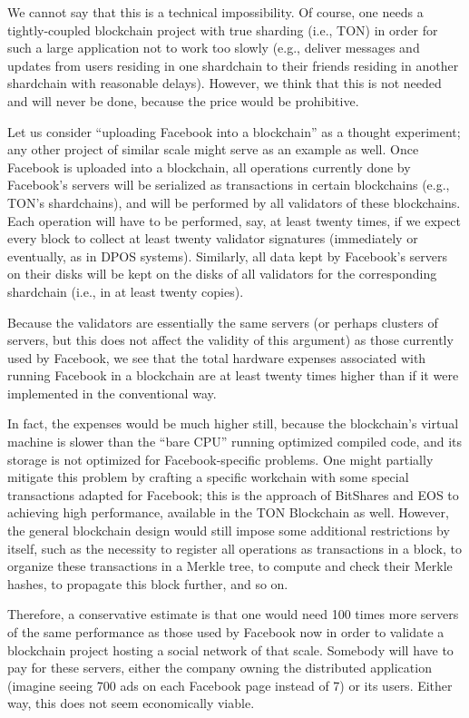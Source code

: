 \documentclass[12pt,oneside]{article}
\begin{document}
We cannot say that this is a technical impossibility. Of course, one
needs a tightly-coupled blockchain project with true sharding (i.e.,
TON) in order for such a large application not to work too slowly
(e.g., deliver messages and updates from users residing in one
shardchain to their friends residing in another shardchain with
reasonable delays). However, we think that this is not needed and will
never be done, because the price would be prohibitive.

Let us consider ``uploading Facebook into a blockchain'' as a thought
experiment; any other project of similar scale might serve as an
example as well. Once Facebook is uploaded into a blockchain, all
operations currently done by Facebook's servers will be serialized as
transactions in certain blockchains (e.g., TON's shardchains), and
will be performed by all validators of these blockchains. Each
operation will have to be performed, say, at least twenty times, if we
expect every block to collect at least twenty validator signatures
(immediately or eventually, as in DPOS systems). Similarly, all data
kept by Facebook's servers on their disks will be kept on the disks of
all validators for the corresponding shardchain (i.e., in at least
twenty copies).

Because the validators are essentially the same servers (or perhaps
clusters of servers, but this does not affect the validity of this
argument) as those currently used by Facebook, we see that the total
hardware expenses associated with running Facebook in a blockchain are
at least twenty times higher than if it were implemented in the
conventional way.

In fact, the expenses would be much higher still, because the
blockchain's virtual machine is slower than the ``bare CPU'' running
optimized compiled code, and its storage is not optimized for
Facebook-specific problems. One might partially mitigate this problem
by crafting a specific workchain with some special transactions
adapted for Facebook; this is the approach of BitShares and EOS to
achieving high performance, available in the TON Blockchain as
well. However, the general blockchain design would still impose some
additional restrictions by itself, such as the necessity to register
all operations as transactions in a block, to organize these
transactions in a Merkle tree, to compute and check their Merkle
hashes, to propagate this block further, and so on.

Therefore, a conservative estimate is that one would need 100 times
more servers of the same performance as those used by Facebook now in
order to validate a blockchain project hosting a social network of
that scale. Somebody will have to pay for these servers, either the
company owning the distributed application (imagine seeing 700 ads on
each Facebook page instead of 7) or its users. Either way, this does
not seem economically viable.
\end{document}
